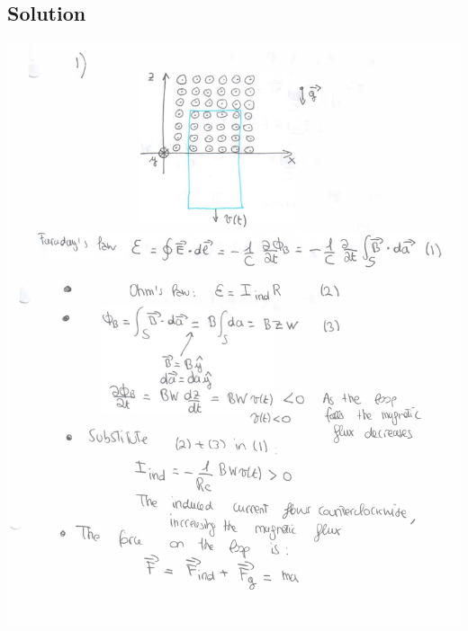 \documentclass[solutions]{esg8022pset}
\begin{document}
\subsection{Solution}
  \begin{center}
    \includegraphics[width = \textwidth, height = 0.9\textheight, keepaspectratio = true]{ps9_1a}
    \clearpage

\end{center}
\end{document}

